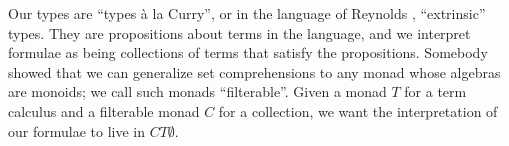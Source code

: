 \documentclass[]{acm_proc_article-sp}
\numberwithin{equation}{subsection}
\begin{document}
\begin{comment}
  * Interpretation of formulae as sets of terms satisfying the formulae

      * set aside what formulae are for the moment

      * data structures have only invertible 2-morphisms

          * e.g. sets are lists mod permutation and duplicate idempotence

      * set comprehension as monad

      * generalize from sets to arbitrary collection, so "sets of terms" is CT

  * Formulae are (T+C)*

  * distributive law

      * (T+C)* -> CT

          * T -> CT via unit of C

          * C -> TC via unit of T

          * TT->T, CC->C via multiplications

          * TC -> CT via distributive law

              * e.g. ({S, K} {a, b, c}) ↦ {(S a), (S b), (S c), (K a), (K b), (K c)}

  * Add modal operators to formulae

      * K is collection of 2-hole contexts using same collection monad

          * A <K> B = { t | ∃u ∈ [| A |], v ∈ [| B |], ρ: K(t, u) -> v}

              * e.g. in SKI or lambda, 
                A => B = { t | ∃u ∈ [| A |], v ∈ [| B |], ρ: (t u) -> v} = A <( )> B

                  * Need to think about reduction contexts here: are all t of the form Rt'?  I guess we can express sets of terms that do not involve R.

              * e.g. in pi calc
                A ▷ B = { t | ∃u ∈ [| A |], v ∈ [| B |], ρ: t | u -> v} = A <|> B

                  * Ditto for COMM

          * Stuff from LICS paper above
\end{comment}

Our types are ``types à la Curry'', or in the language of Reynolds \cite{Reynolds}, ``extrinsic'' types.  They are propositions about terms in the language, and we interpret formulae as being collections of terms that satisfy the propositions.  Somebody \cite{whoever} showed that we can generalize set comprehensions to any monad whose algebras are monoids; we call such monads ``filterable''.  Given a monad $T$ for a term calculus and a filterable monad $C$ for a collection, we want the interpretation of our formulae to live in $CT\emptyset.$
\end{document}
